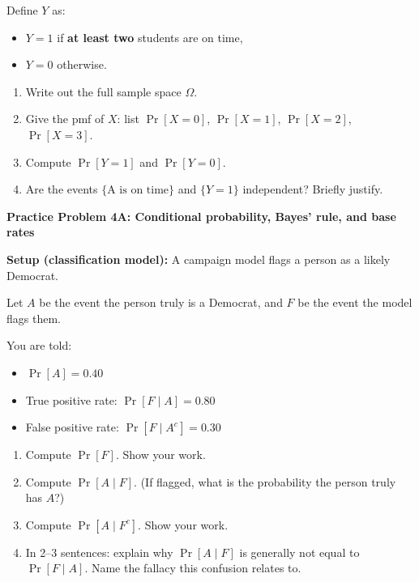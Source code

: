 \documentclass[12pt]{article}
\begin{document}
Define $Y$ as:
\begin{itemize}
  \item $Y=1$ if \textbf{at least two} students are on time,
  \item $Y=0$ otherwise.
\end{itemize}

\begin{enumerate}[label=\arabic*\alph*)]
  \item Write out the full sample space $\Omega$.
  \item Give the pmf of $X$: list $\Pr[X=0]$, $\Pr[X=1]$, $\Pr[X=2]$, $\Pr[X=3]$.
  \item Compute $\Pr[Y=1]$ and $\Pr[Y=0]$.
  \item Are the events $\{\text{A is on time}\}$ and $\{Y=1\}$ independent? Briefly justify.
\end{enumerate}


\vspace{1.5em}
\noindent\textbf{Practice Problem 4A: Conditional probability, Bayes' rule, and base rates}

\noindent \textbf{Setup (classification model):} A campaign model flags a person as a likely Democrat. 

\noindent Let $A$ be the event the person truly is a Democrat, and $F$ be the event the model flags them.

\noindent You are told:
\begin{itemize}
  \item $\Pr[A]=0.40$
  \item True positive rate: $\Pr[F\mid A]=0.80$
  \item False positive rate: $\Pr[F\mid A^c]=0.30$
\end{itemize}

\begin{enumerate}[label=\arabic*\alph*)]
  \item Compute $\Pr[F]$. Show your work.
  \item Compute $\Pr[A\mid F]$. (If flagged, what is the probability the person truly has $A$?)
  \item Compute $\Pr[A\mid F^c]$. Show your work.
  \item In 2--3 sentences: explain why $\Pr[A\mid F]$ is generally not equal to $\Pr[F\mid A]$.
  Name the fallacy this confusion relates to.
\end{enumerate}
\end{document}
